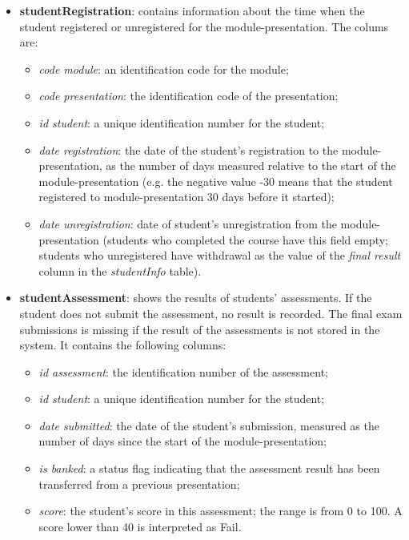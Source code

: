 \documentclass{article}
\begin{document}
\begin{itemize}
    \item \textbf{studentRegistration}: contains information about the time when the student registered or unregistered for the module-presentation. The colums are:
    \begin{itemize}
        \item \textit{code module}: an identification code for the module;
        \item \textit{code presentation}: the identification code of the presentation;
        \item \textit{id student}: a unique identification number for the student;
        \item \textit{date registration}: the date of the student’s registration to the module-presentation, as the number of days measured relative to the start of the module-presentation (e.g. the negative value -30 means that the student registered to module-presentation 30 days before it started);
        \item \textit{date unregistration}: date of student's unregistration from the module-presentation (students  who completed the course have this field empty; students who unregistered have withdrawal as the value of the \textit{final result} column in the \textit{studentInfo} table).
    \end{itemize}

    \item \textbf{studentAssessment}: shows the results of students’ assessments. If the student does not submit the assessment, no result is recorded. The final exam submissions is missing if the result of the assessments is not stored in the system. It contains the following columns:
    \begin{itemize}
        \item \textit{id assessment}: the identification number of the assessment;
        \item \textit{id student}: a unique identification number for the student;
        \item \textit{date submitted}: the date of the student's submission, measured as the number of days since the start of the module-presentation;
        \item \textit{is banked}: a status flag indicating that the assessment result has been transferred from a previous presentation;
        \item \textit{score}: the student’s score in this assessment; the range is from 0 to 100. A score lower than 40 is interpreted as Fail.
    \end{itemize}


\end{itemize}
\end{document}
